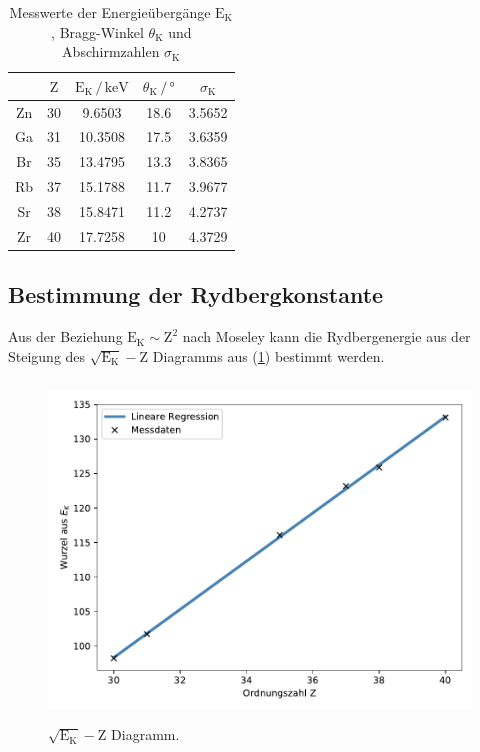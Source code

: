 \begin{table}
    \centering
    \caption{Messwerte der Energieübergänge $\text{E}_\text{K}$, Bragg-Winkel $\theta_\text{K}$ und Abschirmzahlen $\sigma_\text{K}$}
    \label{tab:mess3}
    \begin{tabular}{c c c c c}
    \toprule
         & $\text{Z}$ & $\text{E}_\text{K} \,/\, \mathrm{keV}$ & $\theta_\text{K} \,/\, ° $ & $\sigma_\text{K} $\\
    \midrule 
      Zn & 30 & 9.6503  & 18.6 & 3.5652 \\
      Ga & 31 & 10.3508 & 17.5 & 3.6359 \\
      Br & 35 & 13.4795 & 13.3 & 3.8365 \\
      Rb & 37 & 15.1788 & 11.7 & 3.9677 \\
      Sr & 38 & 15.8471 & 11.2 & 4.2737 \\
      Zr & 40 & 17.7258 & 10   & 4.3729 \\
    \bottomrule
    \end{tabular}
    \end{table}


\subsection{Bestimmung der Rydbergkonstante}    

\noindent
Aus der Beziehung $\text{E}_\text{K} \sim \text{Z}^2$ nach Moseley
kann die Rydbergenergie aus der Steigung des $ \sqrt{\text{E}_\text{K}}-\text{Z}$ Diagramms aus (\ref{fig:mose}) bestimmt werden.

\begin{figure}
    \centering
       \includegraphics[height=9cm]{daten/mose.pdf}
       \caption{$\sqrt{\text{E}_\text{K}}-\text{Z}$ Diagramm.}
       \label{fig:mose}
\end{figure}

